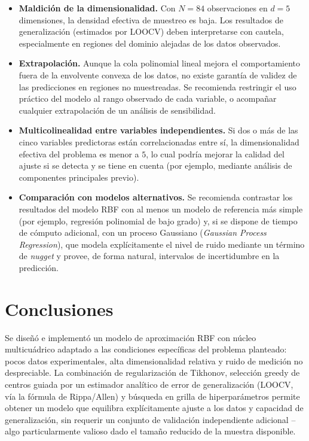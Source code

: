 \documentclass[11pt,a4paper]{article}
\begin{document}
\begin{itemize}
    \item \textbf{Maldici\'on de la dimensionalidad.} Con $N=84$ observaciones
    en $d=5$ dimensiones, la densidad efectiva de muestreo es baja. Los
    resultados de generalizaci\'on (estimados por LOOCV) deben interpretarse
    con cautela, especialmente en regiones del dominio alejadas de los datos
    observados.

    \item \textbf{Extrapolaci\'on.} Aunque la cola polinomial lineal mejora el
    comportamiento fuera de la envolvente convexa de los datos, no existe
    garant\'ia de validez de las predicciones en regiones no muestreadas. Se
    recomienda restringir el uso pr\'actico del modelo al rango observado de
    cada variable, o acompa\~nar cualquier extrapolaci\'on de un an\'alisis de
    sensibilidad.

    \item \textbf{Multicolinealidad entre variables independientes.} Si dos o
    m\'as de las cinco variables predictoras est\'an correlacionadas entre
    s\'i, la dimensionalidad efectiva del problema es menor a $5$, lo cual
    podr\'ia mejorar la calidad del ajuste si se detecta y se tiene en cuenta
    (por ejemplo, mediante an\'alisis de componentes principales previo).

    \item \textbf{Comparaci\'on con modelos alternativos.} Se recomienda
    contrastar los resultados del modelo RBF con al menos un modelo de
    referencia m\'as simple (por ejemplo, regresi\'on polinomial de bajo
    grado) y, si se dispone de tiempo de c\'omputo adicional, con un proceso
    Gaussiano (\emph{Gaussian Process Regression}), que modela expl\'icitamente
    el nivel de ruido mediante un t\'ermino de \emph{nugget} y provee, de forma
    natural, intervalos de incertidumbre en la predicci\'on.
\end{itemize}

\section{Conclusiones}

Se dise\~n\'o e implement\'o un modelo de aproximaci\'on RBF con n\'ucleo
multicu\'adrico adaptado a las condiciones espec\'ificas del problema
planteado: pocos datos experimentales, alta dimensionalidad relativa y ruido
de medici\'on no despreciable. La combinaci\'on de regularizaci\'on de
Tikhonov, selecci\'on greedy de centros guiada por un estimador anal\'itico de
error de generalizaci\'on (LOOCV, v\'ia la f\'ormula de Rippa/Allen) y
b\'usqueda en grilla de hiperpar\'ametros permite obtener un modelo que
equilibra expl\'icitamente ajuste a los datos y capacidad de generalizaci\'on,
sin requerir un conjunto de validaci\'on independiente adicional --algo
particularmente valioso dado el tama\~no reducido de la muestra disponible.
\end{document}
